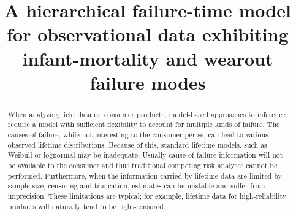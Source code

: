 \documentclass[aoas]{imsart}
\begin{document}
\begin{frontmatter}

\title{A hierarchical failure-time model for observational data exhibiting infant-mortality and wearout failure modes}





\begin{abstract}
When analyzing field data on consumer products, model-based approaches to inference require a model with sufficient flexibility to account for multiple kinds of failure. The causes of failure, while not interesting to the consumer per se, can lead to various observed lifetime distributions. Because of this, standard lifetime models, such as Weibull or lognormal may be inadequate. Usually cause-of-failure information will not be available to the consumer and thus traditional competing risk analyses cannot be performed.
Furthermore, when the information carried by lifetime data are limited by sample size, censoring and truncation, estimates can be unstable and suffer from imprecision. These limitations are typical; for example, lifetime data for high-reliability products will naturally tend to be right-censored.



\end{abstract}
\end{frontmatter}
\end{document}

